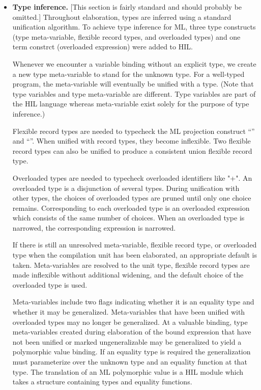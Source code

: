 \documentclass[twoside]{article}
\begin{document}
\begin{itemize}

\item \textbf{Type inference. } [This section is fairly standard and
should probably be omitted.]  Throughout elaboration, types are
inferred using a standard unification algorithm.  To achieve type
inference for ML, three type constructs (type meta-variable, flexible
record types, and overloaded types) and one term constrct (overloaded
expression) were added to HIL.

Whenever we encounter a variable binding without an explicit type, we
create a new type meta-variable to stand for the unknown type.  For a
well-typed program, the meta-variable will eventually be unified with
a type.  (Note that type variables and type meta-variable are
different.  Type variables are part of the HIL language whereas
meta-variable exist solely for the purpose of type inference.)

Flexible record types are needed to typecheck the ML projection
construct ``\cd{\#}'' and ``''.  When unified with record
types, they become inflexible.  Two flexible record types can also be
unified to produce a consistent union flexible record type.

Overloaded types are needed to typecheck overloaded identifiers like "+".
An overloaded type is a disjunction of several types.
During unification with other types, the choices of overloaded types are 
pruned until only one choice remains.  Corresponding to each overloaded type
is an overloaded expression which consists of the same number of choices.
When an overloaded type is narrowed, the corresponding expression is narrowed.

If there is still an unresolved meta-variable, flexible record type,
or overloaded type when the compilation unit has been elaborated, an
appropriate default is taken.  Meta-variables are resolved to the unit
type, flexible record types are made inflexible without additional
widening, and the default choice of the overloaded type is used.

Meta-variables include two flags indicating whether it is an equality
type and whether it may be generalized.  Meta-variables that have been
unified with overloaded types may no longer be generalized.  At a
valuable binding, type meta-variables created during elaboration of the
bound expression that have not been unified or marked ungeneralizable
may be generalized to yield a polymorphic value binding.  If an
equality type is required the generalization must parameterize over
the unknown type and an equality function at that type.  The
translation of an ML polymorphic value is a HIL module which takes a
structure containing types and equality functions.


\end{itemize}
\end{document}

